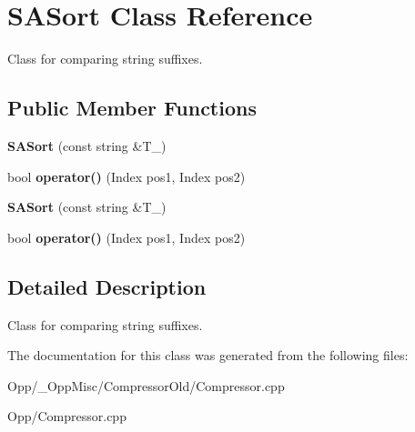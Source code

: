 \hypertarget{class_s_a_sort}{\section{\-S\-A\-Sort \-Class \-Reference}
\label{class_s_a_sort}
}


\-Class for comparing string suffixes.  


\subsection*{\-Public \-Member \-Functions}
\begin{DoxyCompactItemize}
\item 
\hypertarget{class_s_a_sort_ac1696867c674832f5dbf214b0a5b2ced}{{\bfseries \-S\-A\-Sort} (const string \&\-T\-\_\-)}\label{class_s_a_sort_ac1696867c674832f5dbf214b0a5b2ced}

\item 
\hypertarget{class_s_a_sort_a29a47bc0e448ad3d0cb28d8b779f11e6}{bool {\bfseries operator()} (\-Index pos1, \-Index pos2)}\label{class_s_a_sort_a29a47bc0e448ad3d0cb28d8b779f11e6}

\item 
\hypertarget{class_s_a_sort_ac1696867c674832f5dbf214b0a5b2ced}{{\bfseries \-S\-A\-Sort} (const string \&\-T\-\_\-)}\label{class_s_a_sort_ac1696867c674832f5dbf214b0a5b2ced}

\item 
\hypertarget{class_s_a_sort_a29a47bc0e448ad3d0cb28d8b779f11e6}{bool {\bfseries operator()} (\-Index pos1, \-Index pos2)}\label{class_s_a_sort_a29a47bc0e448ad3d0cb28d8b779f11e6}

\end{DoxyCompactItemize}


\subsection{\-Detailed \-Description}
\-Class for comparing string suffixes. 



\-The documentation for this class was generated from the following files\-:\begin{DoxyCompactItemize}
\item 
\-Opp/\-\_\-\-Opp\-Misc/\-Compressor\-Old/\-Compressor.\-cpp\item 
\-Opp/\-Compressor.\-cpp\end{DoxyCompactItemize}
